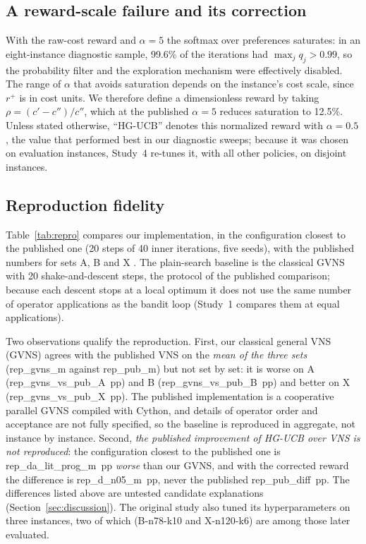 \subsection{A reward-scale failure and its correction}\label{sec:norm}
With the raw-cost reward and $\alpha=5$ the softmax over preferences saturates: in an eight-instance diagnostic sample, 99.6\% of the iterations had $\max_jq_j>0.99$, so the probability filter and the exploration mechanism were effectively disabled. The range of $\alpha$ that avoids saturation depends on the instance's cost scale, since $r^{+}$ is in cost units. We therefore define a dimensionless reward by taking $\rho=(c'-c'')/c''$, which at the published $\alpha=5$ reduces saturation to 12.5\%. Unless stated otherwise, ``HG-UCB'' denotes this normalized reward with $\alpha=0.5$, the value that performed best in our diagnostic sweeps; because it was chosen on evaluation instances, Study~4 re-tunes it, with all other policies, on disjoint instances.

\subsection{Reproduction fidelity}\label{sec:repro}
Table~\ref{tab:repro} compares our implementation, in the configuration closest to the published one (20 steps of 40 inner iterations, five seeds), with the published numbers for sets A, B and X \citep{kalatzantonakis2023}. The plain-search baseline is the classical GVNS with 20 shake-and-descent steps, the protocol of the published comparison; because each descent stops at a local optimum it does not use the same number of operator applications as the bandit loop (Study~1 compares them at equal applications).



Two observations qualify the reproduction. First, our classical general VNS (GVNS) agrees with the published VNS on the \emph{mean of the three sets} (\num{rep_gvns_m} against \num{rep_pub_m}) but not set by set: it is worse on A (\num{rep_gvns_vs_pub_A}~pp) and B (\num{rep_gvns_vs_pub_B}~pp) and better on X (\num{rep_gvns_vs_pub_X}~pp). The published implementation is a cooperative parallel GVNS compiled with Cython, and details of operator order and acceptance are not fully specified, so the baseline is reproduced in aggregate, not instance by instance. Second, \emph{the published improvement of HG-UCB over VNS is not reproduced}: the configuration closest to the published one is \num{rep_da_lit_prog_m}~pp \emph{worse} than our GVNS, and with the corrected reward the difference is \num{rep_d_n05_m}~pp, never the published \num{rep_pub_diff}~pp. The differences listed above are untested candidate explanations (Section~\ref{sec:discussion}). The original study also tuned its hyperparameters on three instances, two of which (B-n78-k10 and X-n120-k6) are among those later evaluated.
